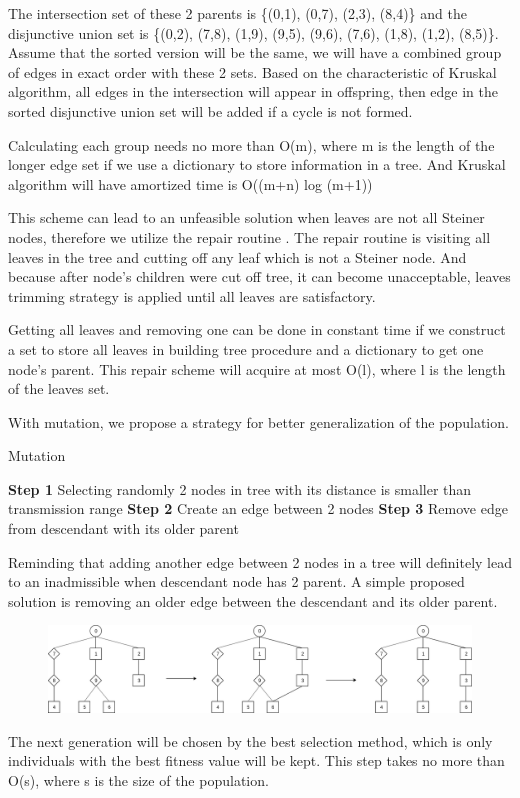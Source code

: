 The intersection set of these 2 parents is \{(0,1), (0,7), (2,3), (8,4)\} and the disjunctive union set is \{(0,2), (7,8), (1,9), (9,5), (9,6), (7,6), (1,8), (1,2), (8,5)\}. Assume that the sorted version will be the same, we will have a combined group of edges in exact order with these 2 sets. Based on the characteristic of Kruskal algorithm, all edges in the intersection will appear in offspring, then edge in the sorted disjunctive union set will be added if a cycle is not formed.

Calculating each group needs no more than O(m), where m is the length of the longer edge set if we use a dictionary to store information in a tree. And Kruskal algorithm will have amortized time is O((m+n) log (m+1))

This scheme can lead to an unfeasible solution when leaves are not all Steiner nodes, therefore we utilize the repair routine \cite{lu2014construction}. The repair routine is visiting all leaves in the tree and cutting off any leaf which is not a Steiner node. And because after node’s children were cut off tree, it can become unacceptable, leaves trimming strategy is applied until all leaves are satisfactory.

Getting all leaves and removing one can be done in constant time if we construct a set to store all leaves in building tree procedure and a dictionary to get one node’s parent. This repair scheme will acquire at most O(l), where l is the length of the leaves set.

With mutation, we propose a strategy for better generalization of the population.

\begin{algorithm}
\caption{Mutation}
\begin{algorithmic}[0]
\State \textbf{Step 1} Selecting randomly 2 nodes in tree with its distance is smaller than transmission range
\State \textbf{Step 2} Create an edge between 2 nodes
\State \textbf{Step 3} Remove edge from descendant with its older parent
\end{algorithmic}
\end{algorithm}

Reminding that adding another edge between 2 nodes in a tree will definitely lead to an inadmissible when descendant node has 2 parent. A simple proposed solution is removing an older edge between the descendant and its older parent.

\begin{figure}
	\centering
	\includegraphics[scale=0.4]{Images/EdgeSetMutation}
\end{figure}

The next generation will be chosen by the best selection method, which is only individuals with the best fitness value will be kept. This step takes no more than O(s), where s is the size of the population.